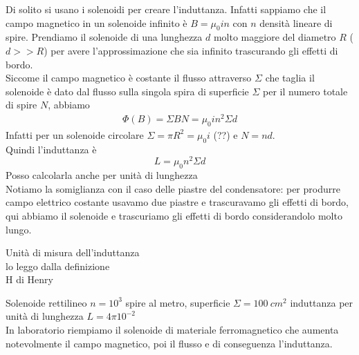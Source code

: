 \begin{examplewt}
	Di solito si usano i solenoidi per creare l'induttanza. Infatti	sappiamo che il campo magnetico in un solenoide infinito è $B=\mu_0 in$ con $n$ densità lineare di spire. Prendiamo il solenoide di una lunghezza $d$ molto maggiore del diametro $R$ ($d>>R$) per avere l'approssimazione che sia infinito trascurando gli effetti di bordo.\\
	Siccome il campo magnetico è costante il flusso attraverso $\Sigma$ che taglia il solenoide è dato dal flusso sulla singola spira di superficie $\Sigma$ per il numero totale di spire $N$, abbiamo
	\begin{gather*}
		\Phi(B)=\Sigma BN= \mu_0 in^2\Sigma d
	\end{gather*}
	Infatti per un solenoide circolare $\Sigma=\pi R^2=\mu_0i$ (??) e $N=nd$.\\
	Quindi l'induttanza è 
	\begin{equation*}
		L=\mu_0 n^2\Sigma d	
	\end{equation*}
	Posso calcolarla anche per unità di lunghezza %
	\\	Notiamo la somiglianza con il caso delle piastre del condensatore: per produrre campo elettrico costante usavamo due piastre e trascuravamo gli effetti di bordo, qui abbiamo il solenoide e trascuriamo gli effetti di bordo considerandolo molto lungo.
\end{examplewt}

Unità di misura dell'induttanza\\
lo leggo dalla definizione \\
H di Henry\\
\begin{example}
	Solenoide rettilineo $n=10^3$ spire al metro, superficie $\Sigma=100\ cm^2$
	induttanza per unità di lunghezza $L=4\pi 10^{-2}$\\
	In laboratorio riempiamo il solenoide di materiale ferromagnetico che aumenta notevolmente il campo magnetico, poi il flusso e di conseguenza l'induttanza.
\end{example}

